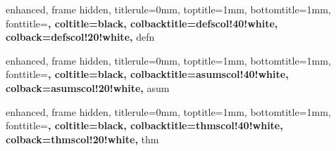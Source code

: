 
{
    enhanced,
    frame hidden,
    titlerule=0mm,
    toptitle=1mm,
    bottomtitle=1mm,
    fonttitle=\bfseries\large,
    coltitle=black,
    colbacktitle=defscol!40!white,
    colback=defscol!20!white,
}{defn}



{
    enhanced,
    frame hidden,
    titlerule=0mm,
    toptitle=1mm,
    bottomtitle=1mm,
    fonttitle=\bfseries\large,
    coltitle=black,
    colbacktitle=asumscol!40!white,
    colback=asumscol!20!white,
}{asum}




{
    enhanced,
    frame hidden,
    titlerule=0mm,
    toptitle=1mm,
    bottomtitle=1mm,
    fonttitle=\bfseries\large,
    coltitle=black,
    colbacktitle=thmscol!40!white,
    colback=thmscol!20!white,
}{thm}



